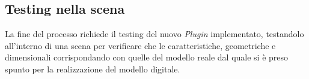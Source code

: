 \subsection{Testing nella scena}
La fine del processo richiede il testing del nuovo \emph{Plugin} implementato, testandolo all'interno
di una scena per verificare che le caratteristiche, geometriche e dimensionali corrispondando con quelle
del modello reale dal quale si è preso spunto per la realizzazione del modello digitale.\\
